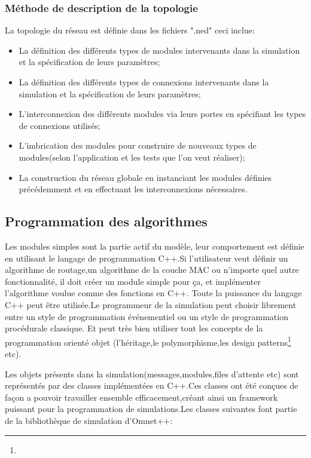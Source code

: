 \subsubsection{Méthode de description de la topologie}
La topologie du réseau est définie dans les fichiers ".ned" ceci inclue:
\begin{itemize}
\item La définition des différents types de modules intervenants dans la simulation et la spécification de leurs paramètres;
\item La définition des différents types de connexions intervenants dans la simulation et la spécification de leurs paramètres;
\item L'interconnexion des différents modules via leurs portes en spécifiant les types de connexions utilisés;
\item L'imbrication des modules pour construire de nouveaux types de modules(selon l'application et les tests que l'on veut réaliser);
\item La construction du réseau globale en instanciant les modules définies précédemment et en effectuant les interconnexions nécessaires.  
\end{itemize}

\subsection{Programmation des algorithmes}

Les modules simples sont la partie actif du modèle, leur comportement est définie en utilisant le langage de programmation C++.Si l'utilisateur veut définir un algorithme de routage,un algorithme de la couche MAC ou n'importe quel autre fonctionnalité, il doit créer un module simple pour ça, et implémenter l'algorithme voulue comme des fonctions en C++.
Toute la puissance du langage C++ peut être utilisée.Le programmeur de la simulation peut choisir librement entre un style de programmation événementiel ou un style de programmation procédurale classique. Et peut très bien utiliser tout les concepts de la programmation orienté objet (l'héritage,le polymorphisme,les design patterns\footnote{} etc).

Les objets présents dans la simulation(messages,modules,files d'attente etc) sont représentés par des classes implémentées en C++.Ces classes ont été conçues de façon a pouvoir travailler ensemble efficacement,créant ainsi  un framework puissant pour la programmation de simulations.Les classes suivantes font partie de la bibliothèque de simulation d'Omnet++:

